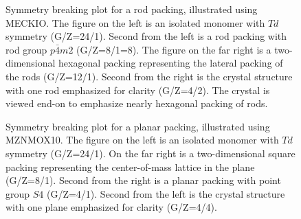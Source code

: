 \documentclass[preprint]{iucr}              %
\begin{document}
\begin{figure}
\caption{Symmetry breaking plot for a rod packing, illustrated using MECKIO.  The figure on the left is an isolated monomer with $Td$ symmetry (G/Z=24/1).  Second from the left is a rod packing with rod group $p\bar{4}m2$ (G/Z=8/1=8).  The figure on the far right is a two-dimensional hexagonal packing representing the lateral packing of the rods (G/Z=12/1).  Second from the right is the crystal structure with one rod emphasized for clarity (G/Z=4/2).  The crystal is viewed end-on to emphasize nearly hexagonal packing of rods.}
\label{fig_MECKIO}
\end{figure}

\begin{figure}
\caption{Symmetry breaking plot for a planar packing, illustrated using MZNMOX10.  The figure on the left is an isolated monomer with $Td$ symmetry (G/Z=24/1).  On the far right is a two-dimensional square packing representing the center-of-mass lattice in the plane (G/Z=8/1).  Second from the right is a planar packing with point group $S4$ (G/Z=4/1).  Second from the left is the crystal structure with one plane emphasized for clarity (G/Z=4/4).}
\label{fig_MZNMOX10}
\end{figure}
\end{document}
